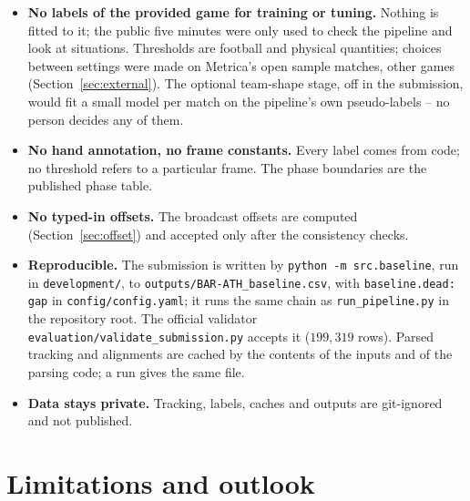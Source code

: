 \documentclass[11pt,a4paper]{article}
\begin{document}
\begin{itemize}[leftmargin=1.2em]
\item \textbf{No labels of the provided game for training or tuning.} Nothing is fitted to it;
  the public five minutes were only used to check the pipeline and look at situations.
  Thresholds are football and physical quantities; choices between settings were made on
  Metrica's open sample matches, other games (Section~\ref{sec:external}). The optional
  team-shape stage, off in the submission, would fit a small model per match on the pipeline's
  own pseudo-labels -- no person decides any of them.
\item \textbf{No hand annotation, no frame constants.} Every label comes from code; no
  threshold refers to a particular frame. The phase boundaries are the published phase table.
\item \textbf{No typed-in offsets.} The broadcast offsets are computed
  (Section~\ref{sec:offset}) and accepted only after the consistency checks.
\item \textbf{Reproducible.} The submission is written by \texttt{python -m src.baseline}, run in
  \nolinkurl{development/}, to \nolinkurl{outputs/BAR-ATH_baseline.csv}, with
  \texttt{baseline.dead: gap} in \nolinkurl{config/config.yaml}; it runs the same chain as
  \nolinkurl{run_pipeline.py} in the repository root. The official validator
  \nolinkurl{evaluation/validate_submission.py} accepts it ($199{,}319$ rows).
  Parsed tracking and alignments are cached by the contents of the inputs and of the parsing
  code; a run gives the same file.
\item \textbf{Data stays private.} Tracking, labels, caches and outputs are git-ignored and not
  published.
\end{itemize}

\section{Limitations and outlook}
\end{document}
